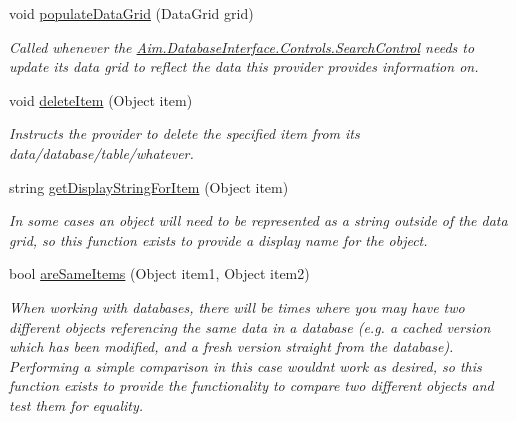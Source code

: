 \begin{DoxyCompactItemize}
\item 
void \mbox{\hyperlink{interface_aim_1_1_database_interface_1_1_interfaces_1_1_i_search_provider_a5f8c9967784a7d938d79d7ffd2ce6628}{populate\+Data\+Grid}} (Data\+Grid grid)
\begin{DoxyCompactList}\small\item\em Called whenever the \mbox{\hyperlink{class_aim_1_1_database_interface_1_1_controls_1_1_search_control}{Aim.\+Database\+Interface.\+Controls.\+Search\+Control}} needs to update it\textquotesingle{}s data grid to reflect the data this provider provides information on. \end{DoxyCompactList}\item 
void \mbox{\hyperlink{interface_aim_1_1_database_interface_1_1_interfaces_1_1_i_search_provider_a553f73f7ca4bdb9c72d1ba047500efe5}{delete\+Item}} (Object item)
\begin{DoxyCompactList}\small\item\em Instructs the provider to delete the specified {\itshape item}  from it\textquotesingle{}s data/database/table/whatever. \end{DoxyCompactList}\item 
string \mbox{\hyperlink{interface_aim_1_1_database_interface_1_1_interfaces_1_1_i_search_provider_aebe4e5ec46e04e7aa3babfe8fcea5269}{get\+Display\+String\+For\+Item}} (Object item)
\begin{DoxyCompactList}\small\item\em In some cases an object will need to be represented as a string outside of the data grid, so this function exists to provide a \textquotesingle{}display name\textquotesingle{} for the object. \end{DoxyCompactList}\item 
bool \mbox{\hyperlink{interface_aim_1_1_database_interface_1_1_interfaces_1_1_i_search_provider_a608a2be47f59cbd951c8003111b18df3}{are\+Same\+Items}} (Object item1, Object item2)
\begin{DoxyCompactList}\small\item\em When working with databases, there will be times where you may have two different objects referencing the same data in a database (e.\+g. a cached version which has been modified, and a fresh version straight from the database). Performing a simple comparison in this case wouldn\textquotesingle{}t work as desired, so this function exists to provide the functionality to compare two different objects and test them for equality. \end{DoxyCompactList}\end{DoxyCompactItemize}


